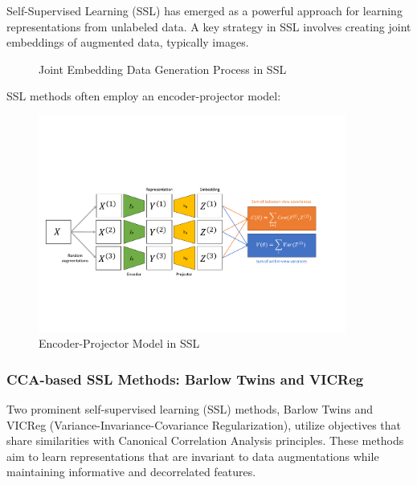 Self-Supervised Learning (SSL) has emerged as a powerful approach for learning representations from unlabeled data. A key strategy in SSL involves creating joint embeddings of augmented data, typically images.

\begin{figure}
\centering
{}
\caption{Joint Embedding Data Generation Process in SSL}
\label{fig:joint_embedding}
\end{figure}

SSL methods often employ an encoder-projector model:

\begin{figure}
\centering
\includegraphics[width=0.9\textwidth]{figures/ssl_schematic}
\caption{Encoder-Projector Model in SSL}
\label{fig:sslschematic}
\end{figure}

\subsubsection{CCA-based SSL Methods: Barlow Twins and VICReg}

Two prominent self-supervised learning (SSL) methods, Barlow Twins and VICReg (Variance-Invariance-Covariance Regularization), utilize objectives that share similarities with Canonical Correlation Analysis principles. These methods aim to learn representations that are invariant to data augmentations while maintaining informative and decorrelated features.

